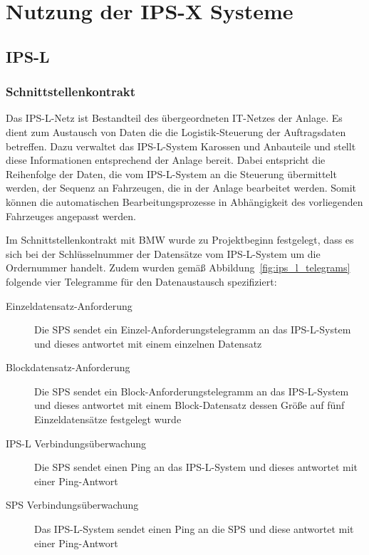 

\chapter{Nutzung der IPS-X Systeme}
\label{chap:interfaces}

\section{IPS-L}
\label{sec:ips_l}

\subsection{Schnittstellenkontrakt}
\label{subsec:ips_l_contract}

Das IPS-L-Netz ist Bestandteil des übergeordneten IT-Netzes der Anlage. Es dient zum Austausch von Daten die die Logistik-Steuerung der Auftragsdaten betreffen. Dazu verwaltet das IPS-L-System Karossen und Anbauteile und stellt diese Informationen entsprechend der Anlage bereit. Dabei entspricht die Reihenfolge der Daten, die vom IPS-L-System an die Steuerung übermittelt werden, der Sequenz an Fahrzeugen, die in der Anlage bearbeitet werden. Somit können die automatischen Bearbeitungsprozesse in Abhängigkeit des vorliegenden Fahrzeuges angepasst werden.

Im Schnittstellenkontrakt mit BMW wurde zu Projektbeginn festgelegt, dass es sich bei der Schlüsselnummer der Datensätze vom IPS-L-System um die Ordernummer handelt. Zudem wurden gemäß Abbildung~\ref{fig:ips_l_telegrams} folgende vier Telegramme für den Datenaustausch spezifiziert:

\begin{description}
    \item [Einzeldatensatz-Anforderung] Die SPS sendet ein Einzel-Anforderungstelegramm an das IPS-L-System und dieses antwortet mit einem einzelnen Datensatz
    \item [Blockdatensatz-Anforderung] Die SPS sendet ein Block-Anforderungstelegramm an das IPS-L-System und dieses antwortet mit einem Block-Datensatz dessen Größe auf fünf Einzeldatensätze festgelegt wurde
    \item [IPS-L Verbindungsüberwachung] Die SPS sendet einen Ping an das IPS-L-System und dieses antwortet mit einer Ping-Antwort
    \item [SPS Verbindungsüberwachung] Das IPS-L-System sendet einen Ping an die SPS und diese antwortet mit einer Ping-Antwort
\end{description}

